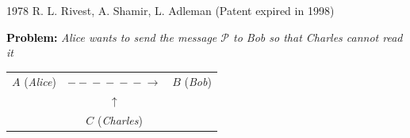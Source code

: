 \documentclass[landscape,display]{powersem} %
\newcommand{\heading}[1]{%
 \begin{center}
  \large\bf
  \shadowbox{{\textcolor{conceptcolor}{#1}}}%
 \end{center}
 \vspace{1ex minus 1ex}}
\begin{document}
\begin{slide}
\heading{The RSA cryptosystem}\pause

1978 R. L. Rivest, A. Shamir, L. Adleman (Patent expired in
1998)\pause

\textbf{\textcolor{black}{Problem:}} \emph{Alice wants to send the
message $\mathcal P$ to Bob so that Charles cannot read it}\pause

\begin{center}\begin{large}
\begin{tabular}{|lcr|}\hline
  $A$ (\textsl{Alice}) & $-\!\!\!-\!\!\!-\!\!\!-\!\!\!-\!\!\!-\!\!\!\rightarrow$ & $B$ (\textsl{Bob})\\
   & $\uparrow$ &  \\
   & $C$ (\textsl{Charles}) &  \\ \hline\end{tabular}
\end{large}\end{center}\pause

\end{slide}
\end{document}
